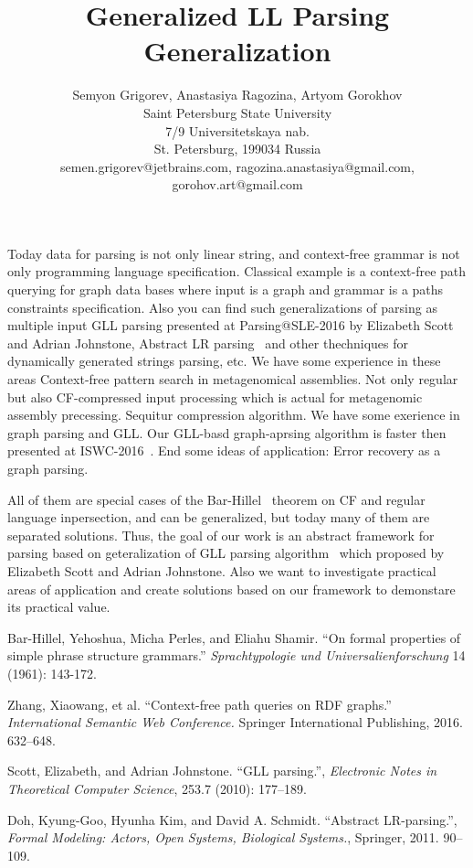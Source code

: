 \documentclass[12pt]{article}  %
\title{Generalized LL Parsing Generalization}
\author{Semyon Grigorev, Anastasiya Ragozina, Artyom Gorokhov
\\
       {Saint Petersburg State University}\\
       {7/9 Universitetskaya nab.}\\
       {St. Petersburg, 199034 Russia}\\
       semen.grigorev@jetbrains.com, ragozina.anastasiya@gmail.com, 
       \\ gorohov.art@gmail.com
       }
\date{}
\theoremstyle{definition}
\theoremstyle{remark}
\begin{document}
\maketitle

Today data for parsing is not only linear string, and context-free grammar is not only programming language specification.
Classical example is a context-free path querying for graph data bases where input is a graph and grammar is a paths constraints specification.
Also you can find such generalizations of parsing as multiple input GLL parsing presented at Parsing@SLE-2016 by Elizabeth Scott and Adrian Johnstone, 
Abstract LR parsing~\cite{AbstractParsing} and other thechniques for dynamically generated strings parsing, etc.
We have some experience in these areas
Context-free pattern search in metagenomical assemblies. Not only regular but also CF-compressed input processing which is actual for metagenomic assembly precessing. 
Sequitur compression algorithm.
We have some exerience in graph parsing and GLL. Our GLL-basd graph-aprsing algorithm is faster 
then presented at ISWC-2016~\cite{CFRDFParsing}.  End some ideas of application: Error recovery as a 
graph parsing. 


All of them are special cases of the Bar-Hillel~\cite{Bar-Hillel} theorem on CF and regular language inpersection, and can be generalized, but today many of them are separated solutions.
Thus, the goal of our work is an abstract framework for parsing based on geteralization of GLL parsing algorithm~\cite{GLL} which proposed by Elizabeth Scott and Adrian Johnstone. 
Also we want to investigate practical areas of application and create solutions based on our framework to demonstare its practical value.

\begin{thebibliography}{9}

  Bar-Hillel, Yehoshua, Micha Perles, and Eliahu Shamir.
  ``On formal properties of simple phrase structure grammars.''
   \emph{Sprachtypologie und Universalienforschung}
   14 (1961): 143-172.

  Zhang, Xiaowang, et al.
  ``Context-free path queries on RDF graphs.'' 
  \emph{International Semantic Web Conference.}
   Springer International Publishing, 2016.
   632--648.

  Scott, Elizabeth, and Adrian Johnstone.   
  ``GLL parsing.'',
  \emph{Electronic Notes in Theoretical Computer Science},
  253.7 (2010): 177--189.

  Doh, Kyung-Goo, Hyunha Kim, and David A. Schmidt.
  ``Abstract LR-parsing.'',
  \emph{Formal Modeling: Actors, Open Systems, Biological Systems.},
  Springer,
  2011.
  90--109.



\end{thebibliography}
\end{document}

